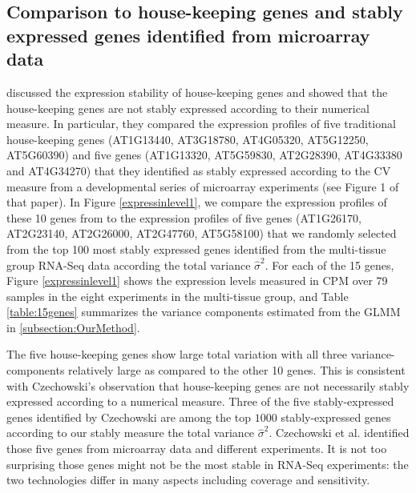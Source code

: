 \documentclass[letterpaper,12pt]{article}
\begin{document}
\subsection{Comparison to house-keeping genes and stably expressed genes
identified from microarray data}\label{section:CompareStablyExpressedGene}
\cite{czechowski2005genome} discussed the expression stability of
house-keeping genes and showed that the house-keeping genes are not stably
expressed according to their numerical measure. In particular, they compared
the expression profiles of five traditional house-keeping genes (AT1G13440,
AT3G18780, AT4G05320, AT5G12250, AT5G60390) and five genes (AT1G13320,
AT5G59830, AT2G28390, AT4G33380 and AT4G34270) that they identified  as stably
expressed according to the CV measure from a developmental series of
microarray experiments (see Figure 1 of that paper).  
In Figure \ref{expressinlevel1}, we compare the expression profiles 
of these 10 genes from \cite{czechowski2005genome} to the expression profiles
of five genes (AT1G26170, AT2G23140, AT2G26000, AT2G47760, AT5G58100) that we
randomly selected from the top 100 most stably expressed genes identified from
the multi-tissue group RNA-Seq data according the total variance $\hat\sigma^2$.
For each of the 15 genes, Figure \ref{expressinlevel1} shows the expression levels measured
in CPM over 79 samples in the eight experiments in the multi-tissue group,
and Table \ref{table:15genes} summarizes the variance components estimated from the
GLMM in \ref{subsection:OurMethod}. 

The five house-keeping genes show large total variation with all three
variance-components relatively large as compared to the other 10 genes. This is
consistent with Czechowski's observation that house-keeping genes are not necessarily stably
expressed according to a numerical measure. Three of the five
stably-expressed genes identified by Czechowski are among the top $1000$
stably-expressed genes according to our stably measure the total variance $\hat\sigma^2$. Czechowski et al.
identified those five genes from microarray data and different experiments. It
is not too surprising those genes might not be the most stable in RNA-Seq
experiments: the two technologies differ in many aspects including coverage
and sensitivity. 
\end{document}
